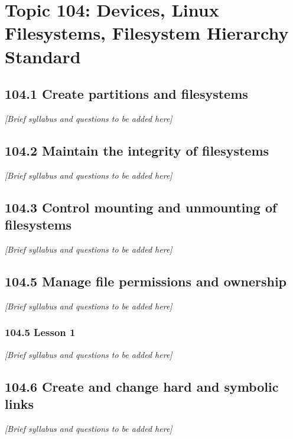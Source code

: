 \documentclass[a4paper]{report}
\begin{document}



\newpage
\chapter{Topic 104: Devices, Linux Filesystems, Filesystem Hierarchy Standard}

\section{104.1 Create partitions and filesystems}
\textit{[Brief syllabus and questions to be added here]}

\section{104.2 Maintain the integrity of filesystems}
\textit{[Brief syllabus and questions to be added here]}

\section{104.3 Control mounting and unmounting of filesystems}
\textit{[Brief syllabus and questions to be added here]}

\section{104.5 Manage file permissions and ownership}
\textit{[Brief syllabus and questions to be added here]}

\subsection*{104.5 Lesson 1}
\textit{[Brief syllabus and questions to be added here]}

\section{104.6 Create and change hard and symbolic links}
\textit{[Brief syllabus and questions to be added here]}
\end{document}
